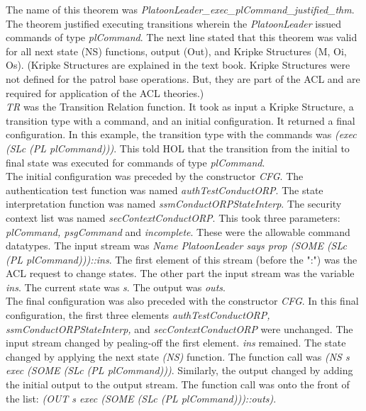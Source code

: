  The name of this theorem was \textit{PlatoonLeader_exec_plCommand_justified_thm}.  The theorem
  justified executing transitions wherein the \textit{PlatoonLeader} issued commands of type \textit{plCommand}.
  The next line stated that this theorem was valid for all next state (NS) functions, output (Out),
  and Kripke Structures (M, Oi, Os).  (Kripke Structures are explained in the text book.  Kripke
  Structures were not defined for the patrol base operations.  But, they are part of the ACL and are
  required for application of the ACL theories.)
  \\
 \textit{TR} was the Transition Relation function.  It took as input a Kripke Structure,
  a transition type with a command, and an initial configuration.  It returned a final configuration.
  In this example, the transition type with the commands was \textit{(exec (SLc (PL plCommand)))}.
  This told HOL that the transition from the initial to final state was executed for commands of type
  \textit{plCommand}.\\
  
 The initial configuration was preceded by the constructor \textit{CFG}.  The authentication
  test function was named \textit{authTestConductORP}.  The state interpretation function was named
  \textit{ssmConductORPStateInterp}.  The security context list was named \textit{secContextConductORP}.
  This took three parameters: \textit{plCommand, psgCommand} and \textit{incomplete}.  These were the
  allowable command datatypes.  The input stream was \textit{Name PlatoonLeader says prop (SOME (SLc
    (PL plCommand)))::ins}. The first element of this stream (before the ":") was the ACL request to
  change states.  The other part the input stream was the variable \textit{ins}.  The current state
  was \textit{s}.  The output was \textit{outs}.\\
  
 The final configuration was also preceded with the constructor \textit{CFG}.  In this final
  configuration, the first three elements \textit{authTestConductORP, ssmConductORPStateInterp,} and
  \textit{secContextConductORP}  were unchanged.  The input stream changed by pealing-off the first
  element.  \textit{ins} remained.  The state changed by applying the next state \textit{(NS)} function.
  The function call was \textit{(NS s exec (SOME (SLc (PL plCommand)))}.  Similarly, the output changed
  by adding the initial output to the output stream. The function call was onto the front of the list:
  \textit{(OUT s exec (SOME (SLc (PL plCommand)))::outs)}.\\
  
